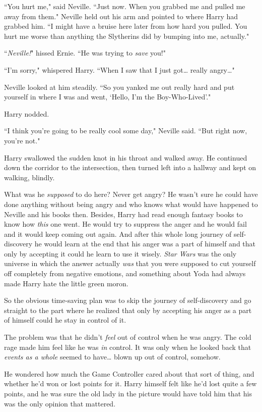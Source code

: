 ``You hurt me," said Neville. ``Just now. When you grabbed me and pulled me away from them." Neville held out his arm and pointed to where Harry had grabbed him. ``I might have a bruise here later from how hard you pulled. You hurt me worse than anything the Slytherins did by bumping into me, actually."

``\emph{Neville!}" hissed Ernie. ``He was trying to \emph{save} you!"

``I'm sorry," whispered Harry. ``When I saw that I just got{\ldots} really angry{\ldots}"

Neville looked at him steadily. ``So you yanked me out really hard and put yourself in where I was and went, `Hello, I'm the Boy-Who-Lived'."

Harry nodded.

``I think you're going to be really cool some day," Neville said. ``But right now, you're not."

Harry swallowed the sudden knot in his throat and walked away. He continued down the corridor to the intersection, then turned left into a hallway and kept on walking, blindly.

What was he \emph{supposed} to do here? Never get angry? He wasn't sure he could have done anything without being angry and who knows what would have happened to Neville and his books then. Besides, Harry had read enough fantasy books to know how \emph{this} one went. He would try to suppress the anger and he would fail and it would keep coming out again. And after this whole long journey of self-discovery he would learn at the end that his anger was a part of himself and that only by accepting it could he learn to use it wisely. \emph{Star Wars} was the only universe in which the answer actually \emph{was} that you were supposed to cut yourself off completely from negative emotions, and something about Yoda had always made Harry hate the little green moron.

So the obvious time-saving plan was to skip the journey of self-discovery and go straight to the part where he realized that only by accepting his anger as a part of himself could he stay in control of it.

The problem was that he didn't \emph{feel} out of control when he was angry. The cold rage made him feel like he was \emph{in} control. It was only when he looked back that \emph{events as a whole} seemed to have{\ldots} blown up out of control, somehow.

He wondered how much the Game Controller cared about that sort of thing, and whether he'd won or lost points for it. Harry himself felt like he'd lost quite a few points, and he was sure the old lady in the picture would have told him that his was the only opinion that mattered.

